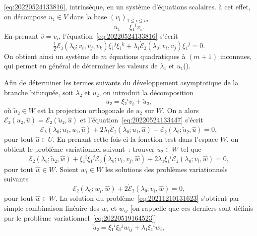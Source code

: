 \documentclass[12pt, final]{amsart}
\theoremstyle{definition}
\begin{document}
\eqref{eq:20220524133816}, intrinsèque, en un système d'équations scalaires. à
cet effet, on décompose \(u₁∈V\) dans la base \((v_i)_{1 ≤ i ≤ m}\)
\begin{equation}
  \label{eq:20220524133944}
  u₁ = ξ₁^i v_i.
\end{equation}
En prenant \(\hat{v} = v_i\), l'équation~\eqref{eq:20220524133816} s'écrit
\begin{equation}
  \label{eq:20220524134121}
  \tfrac{1}{2} ℰ₃(λ₀; v_i, v_j, v_k)ξ₁^j ξ₁^k + λ₁ \dot{ℰ}₂(λ₀; v_i, v_j) ξ₁^j = 0.
\end{equation}
On obtient ainsi un système de \(m\) équations quadratiques à \((m + 1)\)
inconnues, qui permet en général de déterminer les valeurs de \(λ₁\) et
\(u₁\)().

Afin de déterminer les termes suivants du développement asymptotique de la
branche bifurquée, soit \(λ₂\) et \(u₂\), on introduit la décomposition
\begin{equation}
  u₂ = ξ₂^i v_i + \tilde{u}₂,
\end{equation}
où \(\tilde{u}₂∈W\) est la projection orthogonale de \(u₂\) sur \(W\). On a
alors \(ℰ₂(u₂, \hat{u}) =ℰ₂(\tilde{u}₂, \hat{u})\) et
l'équation~\eqref{eq:20220524133447} s'écrit
\begin{equation}
 ℰ₃(λ₀; u₁, u₁, \hat{u}) + 2λ₁ \dot{ℰ}₂(λ₀; u₁, \hat{u}) + ℰ₂(λ₀; \tilde{u}₂, \hat{u}) = 0,
\end{equation}
pour tout \(\hat{u}∈U\). En prenant cette fois-ci la fonction test dans l'espace
\(W\), on obtient le problème variationnel suivant~: trouver \(\tilde{u}₂∈W\)
tel que
\begin{equation}
  \label{eq:20211210131623}
  ℰ₂(λ₀; \tilde{u}₂, \hat{w}) + ξ₁^i ξ₁^j ℰ₃(λ₀; v_i, v_j, \hat{w}) + 2λ₁ ξ₁^i \dot{ℰ}₂(λ₀; v_i, \hat{w}) = 0,
\end{equation}
pour tout \(\hat{w}∈W\). Soient \(w_i∈W\) les solutions des problèmes
variationnels suivants
\begin{equation}
  \label{eq:20220524134525}
  ℰ₂(λ₀; w_i, \hat{w}) + 2\dot{ℰ}₂(λ₀; v_i, \hat{w}) = 0,
\end{equation}
pour tout \(\hat{w}∈W\). La solution du problème~\eqref{eq:20211210131623}
s'obtient par simple combinaison linéaire des \(w_i\) et \(w_{ij}\) [on rappelle
que ces derniers sont définis par le problème
variationnel~\eqref{eq:20220519164523}]
\begin{equation}
 \tilde{u}₂ = ξ₁^i ξ₁^j w_{ij} + λ₁ ξ₁^i w_i,
\end{equation}
\end{document}
